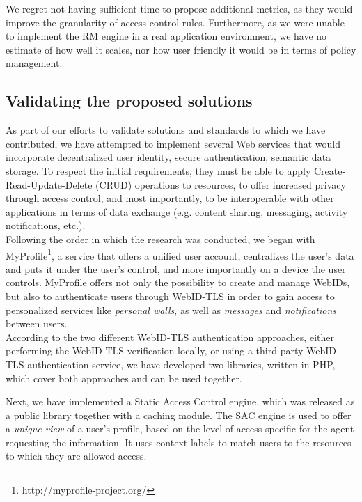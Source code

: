 We regret not having sufficient time to propose additional metrics, as they would improve the granularity of access control rules. Furthermore, as we were unable to implement the RM engine in a real application environment, we have no estimate of how well it scales, nor how user friendly it would be in terms of policy management.


\subsection{Validating the proposed solutions}
As part of our efforts to validate solutions and standards to which we have contributed, we have attempted to implement several Web services that would incorporate decentralized user identity, secure authentication, semantic data storage. To respect the initial requirements, they must be able to apply Create-Read-Update-Delete (CRUD) operations to resources, to offer increased privacy through access control, and most importantly, to be interoperable with other applications in terms of data exchange (e.g. content sharing, messaging, activity notifications, etc.).\\

Following the order in which the research was conducted, we began with MyProfile\footnote{http://myprofile-project.org/}, a service that offers a unified user account, centralizes the user's data and puts it under the user's control, and more importantly on a device the user controls. MyProfile offers not only the possibility to create and manage WebIDs, but also to authenticate users through WebID-TLS in order to gain access to personalized services like \textit{personal walls}, as well as \textit{messages} and \textit{notifications} between users.\\

According to the two different WebID-TLS authentication approaches, either performing the WebID-TLS verification locally, or using a third party WebID-TLS authentication service, we have developed two libraries, written in PHP, which cover both approaches and can be used together. 

Next, we have implemented a Static Access Control engine, which was released as a public library together with a caching module. The SAC engine is used to offer a \textit{unique view} of a user's profile, based on the level of access specific for the agent requesting the information. It uses context labels to match users to the resources to which they are allowed access.\\

